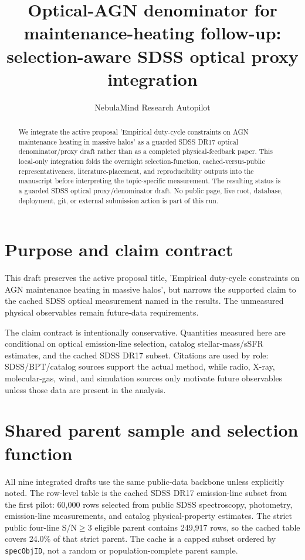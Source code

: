\documentclass[twocolumn]{aastex631}
\begin{document}
\title{Optical-AGN denominator for maintenance-heating follow-up: selection-aware SDSS optical proxy integration}
\author{NebulaMind Research Autopilot}

\begin{abstract}
We integrate the active proposal 'Empirical duty-cycle constraints on AGN maintenance heating in massive halos' as a guarded SDSS DR17 optical denominator/proxy draft rather than as a completed physical-feedback paper. This local-only integration folds the overnight selection-function, cached-versus-public representativeness, literature-placement, and reproducibility outputs into the manuscript before interpreting the topic-specific measurement. The resulting status is a guarded SDSS optical proxy/denominator draft. No public page, live root, database, deployment, git, or external submission action is part of this run.
\end{abstract}


\section{Purpose and claim contract}\label{sec:purpose}
This draft preserves the active proposal title, 'Empirical duty-cycle constraints on AGN maintenance heating in massive halos', but narrows the supported claim to the cached SDSS optical measurement named in the results. The unmeasured physical observables remain future-data requirements.

The claim contract is intentionally conservative. Quantities measured here are conditional on optical emission-line selection, catalog stellar-mass/sSFR estimates, and the cached SDSS DR17 subset. Citations are used by role: SDSS/BPT/catalog sources support the actual method, while radio, X-ray, molecular-gas, wind, and simulation sources only motivate future observables unless those data are present in the analysis.


\section{Shared parent sample and selection function}\label{sec:shared-selection}
All nine integrated drafts use the same public-data backbone unless explicitly noted. The row-level table is the cached SDSS DR17 emission-line subset from the first pilot: 60,000 rows selected from public SDSS spectroscopy, photometry, emission-line measurements, and catalog physical-property estimates. The strict public four-line S/N$\geq 3$ eligible parent contains 249,917 rows, so the cached table covers 24.0\% of that strict parent. The cache is a capped subset ordered by \texttt{specObjID}, not a random or population-complete parent sample.
\end{document}
